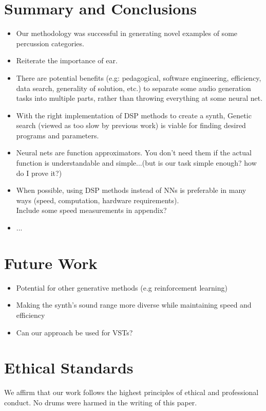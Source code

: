 \documentclass{nime-alternate} %
\begin{document}
\section{Summary and Conclusions}

\begin{itemize}
    \item Our methodology was successful in generating novel examples of some percussion categories.
    \item Reiterate the importance of ear.
    \item There are potential benefits (e.g: pedagogical, software engineering, efficiency, data search, generality of solution, etc.) to separate some audio generation tasks into multiple parts, rather than throwing everything at some neural net. 
    \item With the right implementation of DSP methods to create a synth, Genetic search (viewed as too slow by previous work) is viable for finding desired programs and parameters.
    \item Neural nets are function approximators. You don't need them if the actual function is understandable and simple...(but is our task simple enough? how do I prove it?)
    \item When possible, using DSP methods instead of NNs is preferable in many ways (speed, computation, hardware requirements).\\
    \colorbox{green!=30}{Include some speed measurements in appendix?}
    \item ...
\end{itemize}
\section{Future Work}
\begin{itemize}
    \item Potential for other generative methods (e.g reinforcement learning)
    \item Making the synth's sound range more diverse while maintaining speed and efficiency
    \item Can our approach be used for VSTs?
\end{itemize}

\section{Ethical Standards}
We affirm that our work follows the highest principles of ethical and professional conduct. No drums were harmed in the writing of this paper.

     
\end{document}
